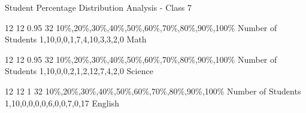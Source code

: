 \label{1.3.2 C7 Student Distribution Analysis}
    \renewcommand{\insertclass}{ - Class 7}

    \renewcommand{\insertsubject}{Math \& Science \& English}


    \begin{frame}{Student Percentage Distribution Analysis - Class 7}
    \begin{minipage}{0.285\paperwidth}
    \studentDistribution
        {12}
        {12}
        {0.95}
        {32}
        {10\%,20\%,30\%,40\%,50\%,60\%,70\%,80\%,90\%,100\%}
        {Number of Students}
        {}
        {{1},{10},{0,0,1,7,4,10,3,3,2,0}}
        {Math}
    \end{minipage}
    \begin{minipage}{0.285\paperwidth}
    \studentDistribution
        {12}
        {12}
        {0.95}
        {32}
        {10\%,20\%,30\%,40\%,50\%,60\%,70\%,80\%,90\%,100\%}
        {Number of Students}
        {}
        {{1},{10},{0,0,2,1,2,12,7,4,2,0}}
        {Science}
    \end{minipage}
    \begin{minipage}{0.285\paperwidth}
    \studentDistributionwithoutline
        {12}
        {12}
        {1}
        {32}
        {10\%,20\%,30\%,40\%,50\%,60\%,70\%,80\%,90\%,100\%}
        {Number of Students}
        {}
        {{1},{10},{0,0,0,0,6,0,0,7,0,17}}
        {English}
    \end{minipage}
    
    \end{frame}

    
    